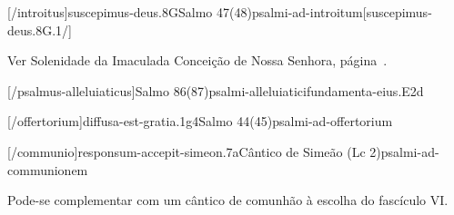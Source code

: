 \AllowPageFlush

[\Prefix/introitus]{suscepimus-deus.8G}{Salmo 47(48)}{psalmi-ad-introitum}[suscepimus-deus.8G.1/]


\begin{rubrica}
  Ver Solenidade da Imaculada Conceição de Nossa Senhora, página~\pageref{subsection:proprium-sanctorum/in-conceptione-immaculata-bmv/psalmus-responsorius}.
\end{rubrica}


\AllowPageFlush

[\Prefix/psalmus-alleluiaticus]{Salmo 86(87)}{psalmi-alleluiatici}{fundamenta-eius.E2d}

\AllowPageFlush

[\Prefix/offertorium]{diffusa-est-gratia.1g4}{Salmo 44(45)}{psalmi-ad-offertorium}

\AllowPageFlush

[\Prefix/communio]{responsum-accepit-simeon.7a}{Cântico de Simeão (Lc 2)}{psalmi-ad-communionem}

\begin{rubrica}
  Pode-se complementar com um cântico de comunhão à escolha do fascículo VI.
\end{rubrica}

\AllowPageBreak